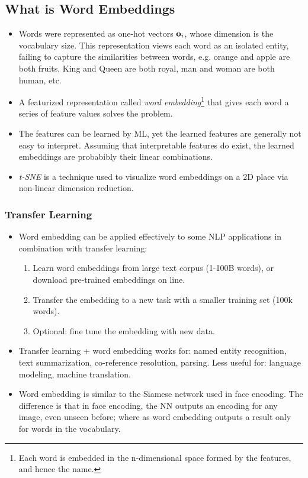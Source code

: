 \subsection{What is Word Embeddings}
\begin{itemize}
  \item Words were represented as one-hot vectors $\mathbf{o}_{i}$, whose dimension is the vocabulary size. This representation views each word as an isolated entity, failing to capture the similarities between words, e.g. orange and apple are both fruits, King and Queen are both royal, man and woman are both human, etc. 
  \item A featurized representation called \textit{word embedding}\footnote{Each word is embedded in the n-dimensional space formed by the features, and hence the name.} that gives each word a series of feature values solves the problem. 
  \item The features can be learned by ML, yet the learned features are generally not easy to interpret. Assuming that interpretable features do exist, the learned embeddings are probabibly their linear combinations.
  \item \textit{t-SNE} is a technique used to visualize word embeddings on a 2D place via non-linear dimension reduction. 
\end{itemize}
\subsubsection{Transfer Learning}
\begin{itemize}
  \item Word embedding can be applied effectively to some NLP applications in combination with transfer learning:
    \begin{enumerate}
      \item Learn word embeddings from large text corpus (1-100B words), or download pre-trained embeddings on line.
      \item Transfer the embedding to a new task with a smaller training set (100k words).
      \item Optional: fine tune the embedding with new data.
    \end{enumerate}
  \item Transfer learning + word embedding works for: named entity recognition, text summarization, co-reference resolution, parsing. Less useful for: language modeling, machine translation.
  \item Word embedding is similar to the Siamese network used in face encoding. The difference is that in face encoding, the NN outputs an encoding for any image, even unseen before; where as word embedding outputs a result only for words in the vocabulary.
\end{itemize}

